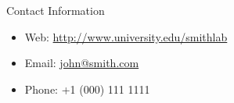\documentclass[final]{beamer}
\newlength{\onecolwid}
\begin{document}
\begin{frame}[t]
\begin{columns}[t]
\begin{column}{\onecolwid}

\begin{alertblock}{Contact Information}

\begin{itemize}
\item Web: \href{http://www.university.edu/smithlab}{http://www.university.edu/smithlab}
\item Email: \href{mailto:john@smith.com}{john@smith.com}
\item Phone: +1 (000) 111 1111
\end{itemize}

\end{alertblock}



\end{column} %

\end{columns} %

\end{frame} %
\end{document}
